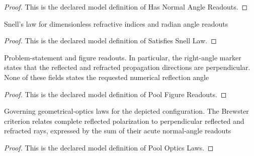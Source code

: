 \begin{proof}
  This is the declared model definition of Has Normal Angle Readouts.
\end{proof}
\begin{definition}
  \label{def:physics:phyx-mini-0037:phyxminiproblems-problemphyxmini0037-satisfiessnelllaw}
  Snell's law for dimensionless refractive indices and radian angle readouts
\end{definition}
\begin{proof}
  This is the declared model definition of Satisfies Snell Law.
\end{proof}
\begin{definition}
  \label{def:physics:phyx-mini-0037:phyxminiproblems-problemphyxmini0037-poolfigurereadouts}
  Problem-statement and figure readouts. In particular, the right-angle marker states that the reflected and refracted propagation directions are perpendicular. None of these fields states the requested numerical reflection angle
\end{definition}
\begin{proof}
  This is the declared model definition of Pool Figure Readouts.
\end{proof}
\begin{definition}
  \label{def:physics:phyx-mini-0037:phyxminiproblems-problemphyxmini0037-poolopticslaws}
  Governing geometrical-optics laws for the depicted configuration. The Brewster criterion relates complete reflected polarization to perpendicular reflected and refracted rays, expressed by the sum of their acute normal-angle readouts
\end{definition}
\begin{proof}
  This is the declared model definition of Pool Optics Laws.
\end{proof}
